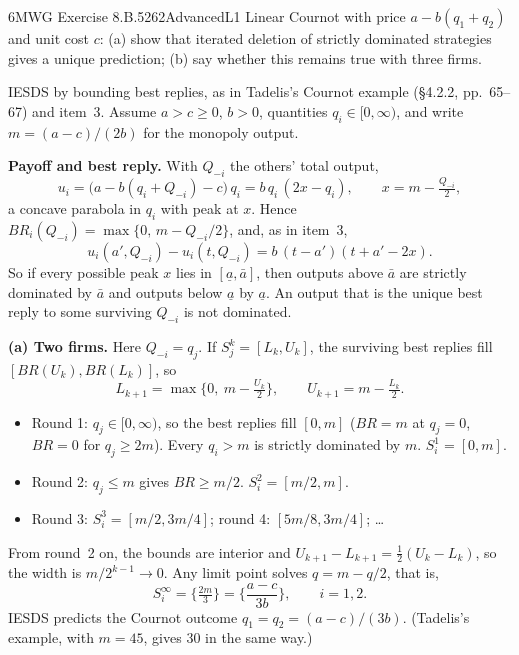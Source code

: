 \begin{exsol}{6}{MWG Exercise 8.B.5}{262}{Advanced}{L1}
\asked Linear Cournot with price $a - b(q_1 + q_2)$ and unit cost $c$: (a) show that iterated
deletion of strictly dominated strategies gives a unique prediction; (b) say whether this
remains true with three firms.

\method IESDS by bounding best replies, as in Tadelis's Cournot example (\S4.2.2, pp.~65--67)
and item~3. Assume $a > c \ge 0$, $b > 0$, quantities $q_i \in [0, \infty)$, and write
$m = (a-c)/(2b)$ for the monopoly output.

\solution
\textbf{Payoff and best reply.} With $Q_{-i}$ the others' total output,
\[
  u_i = \big(a - b(q_i + Q_{-i}) - c\big)\, q_i = b\, q_i\,(2x - q_i), \qquad x = m - \tfrac{Q_{-i}}{2},
\]
a concave parabola in $q_i$ with peak at $x$. Hence $BR_i(Q_{-i}) = \max\{0,\, m - Q_{-i}/2\}$,
and, as in item~3,
\[
  u_i(a', Q_{-i}) - u_i(t, Q_{-i}) = b\,(t - a')(t + a' - 2x). \tag{1}
\]
So if every possible peak $x$ lies in $[\underline a, \bar a]$, then outputs above $\bar a$ are
strictly dominated by $\bar a$ and outputs below $\underline a$ by $\underline a$. An output that
is the unique best reply to some surviving $Q_{-i}$ is not dominated.

\textbf{(a) Two firms.} Here $Q_{-i} = q_j$. If $S_j^k = [L_k, U_k]$, the surviving best replies
fill $[BR(U_k), BR(L_k)]$, so
\[
  L_{k+1} = \max\{0,\ m - \tfrac{U_k}{2}\}, \qquad U_{k+1} = m - \tfrac{L_k}{2}.
\]
\begin{itemize}
  \item Round 1: $q_j \in [0, \infty)$, so the best replies fill $[0, m]$ ($BR = m$ at $q_j = 0$,
  $BR = 0$ for $q_j \ge 2m$). Every $q_i > m$ is strictly dominated by $m$. $S_i^1 = [0, m]$.
  \item Round 2: $q_j \le m$ gives $BR \ge m/2$. $S_i^2 = [m/2, m]$.
  \item Round 3: $S_i^3 = [m/2, 3m/4]$; round 4: $[5m/8, 3m/4]$; \dots
\end{itemize}
From round~2 on, the bounds are interior and $U_{k+1} - L_{k+1} = \tfrac12 (U_k - L_k)$, so the
width is $m/2^{k-1} \to 0$. Any limit point solves $q = m - q/2$, that is,
\[
  S_i^\infty = \Big\{\tfrac{2m}{3}\Big\} = \Big\{\frac{a - c}{3b}\Big\}, \qquad i = 1, 2 .
\]
IESDS predicts the Cournot outcome $q_1 = q_2 = (a-c)/(3b)$. (Tadelis's example, with
$m = 45$, gives 30 in the same way.)


\end{exsol}
